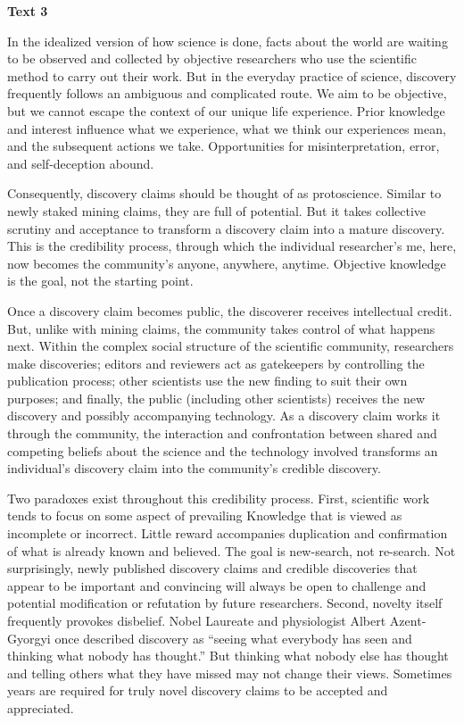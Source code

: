 \textbf{Text 3}

In the idealized version of how science is done, facts about the world are waiting to be observed and collected by objective researchers who use the scientific method to carry out their work. But in the everyday practice of science, discovery frequently follows an ambiguous and complicated route. We aim to be objective, but we cannot escape the context of our unique life experience. Prior knowledge and interest influence what we experience, what we think our experiences mean, and the subsequent actions we take. Opportunities for misinterpretation, error, and self-deception abound.

Consequently, discovery claims should be thought of as protoscience. Similar to newly staked mining claims, they are full of potential. But it takes collective scrutiny and acceptance to transform a discovery claim into a mature discovery. This is the credibility process, through which the individual researcher’s me, here, now becomes the community’s anyone, anywhere, anytime. Objective knowledge is the goal, not the starting point.

Once a discovery claim becomes public, the discoverer receives intellectual credit. But, unlike with mining claims, the community takes control of what happens next. Within the complex social structure of the scientific community, researchers make discoveries; editors and reviewers act as gatekeepers by controlling the publication process; other scientists use the new finding to suit their own purposes; and finally, the public (including other scientists) receives the new discovery and possibly accompanying technology. As a discovery claim works it through the community, the interaction and confrontation between shared and competing beliefs about the science and the technology involved transforms an individual’s discovery claim into the community’s credible discovery.

Two paradoxes exist throughout this credibility process. First, scientific work tends to focus on some aspect of prevailing Knowledge that is viewed as incomplete or incorrect. Little reward accompanies duplication and confirmation of what is already known and believed. The goal is new-search, not re-search. Not surprisingly, newly published discovery claims and credible discoveries that appear to be important and convincing will always be open to challenge and potential modification or refutation by future researchers. Second, novelty itself frequently provokes disbelief. Nobel Laureate and physiologist Albert Azent-Gyorgyi once described discovery as “seeing what everybody has seen and thinking what nobody has thought.” But thinking what nobody else has thought and telling others what they have missed may not change their views. Sometimes years are required for truly novel discovery claims to be accepted and appreciated.


